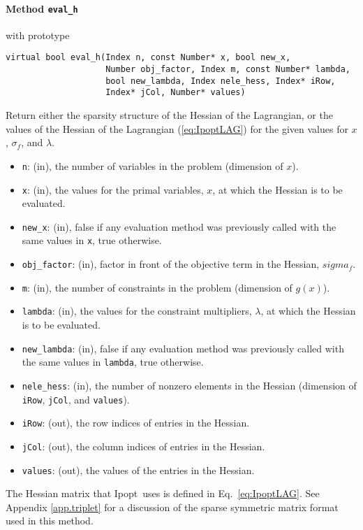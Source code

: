 \documentclass[10pt]{article}
\newcommand{\Ipopt}{{\sc Ipopt}}
\begin{document}
\paragraph{Method {\texttt{eval\_h}}} with prototype
\begin{verbatim}
virtual bool eval_h(Index n, const Number* x, bool new_x,
                    Number obj_factor, Index m, const Number* lambda,
                    bool new_lambda, Index nele_hess, Index* iRow,
                    Index* jCol, Number* values)
\end{verbatim}
Return either the sparsity structure of the Hessian of the Lagrangian, or the values of the 
Hessian of the Lagrangian (\ref{eq:IpoptLAG}) for the given values for $x$,
$\sigma_f$, and $\lambda$.
\begin{itemize}
\item {\tt n}: (in), the number of variables in the problem (dimension
  of $x$).
\item {\tt x}: (in), the values for the primal variables, $x$, at which
  the Hessian is to be evaluated.
\item {\tt new\_x}: (in), false if any evaluation method was previously called 
        with the same values in {\tt x}, true otherwise.
\item {\tt obj\_factor}: (in), factor in front of the objective term
  in the Hessian, $sigma_f$.
\item {\tt m}: (in), the number of constraints in the problem (dimension of $g(x)$).
\item {\tt lambda}: (in), the values for the constraint multipliers,
  $\lambda$, at which the Hessian is to be evaluated.
\item {\tt new\_lambda}: (in), false if any evaluation method was
  previously called with the same values in {\tt lambda}, true
  otherwise.
\item {\tt nele\_hess}: (in), the number of nonzero elements in the
  Hessian (dimension of {\tt iRow}, {\tt jCol}, and {\tt values}).
\item {\tt iRow}: (out), the row indices of entries in the Hessian.
\item {\tt jCol}: (out), the column indices of entries in the Hessian.
\item {\tt values}: (out), the values of the entries in the Hessian.
\end{itemize}

The Hessian matrix that \Ipopt\ uses is defined in
Eq.~\ref{eq:IpoptLAG}.  See Appendix \ref{app.triplet} for a
discussion of the sparse symmetric matrix format used in this method.
\end{document}
